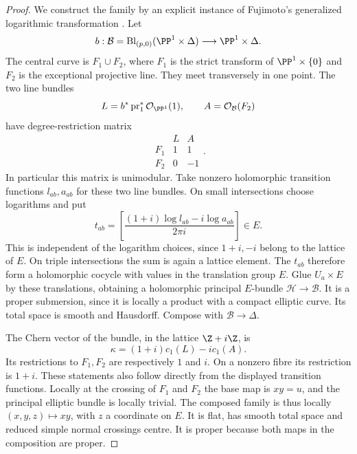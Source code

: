 \begin{proof}
We construct the family by an explicit instance of Fujimoto's
generalized logarithmic transformation
\citep[Definition 1.1, pp.~85--86]{Fujimoto1990AB}.
Let
\[
 b:\mathcal B=\operatorname{Bl}_{(p,0)}(\PP^1\times\Delta)
       \longrightarrow\PP^1\times\Delta.
\]
The central curve is $F_1\cup F_2$, where $F_1$ is the strict
transform of $\PP^1\times\{0\}$ and $F_2$ is the exceptional
projective line.  They meet transversely in one point.  The two
line bundles
\[
 L=b^*\operatorname{pr}_1^*\mathcal O_{\PP^1}(1),
 \qquad A=\mathcal O_{\mathcal B}(F_2)
\]
have degree-restriction matrix
\[
 \begin{array}{c|rr}
       &L&A\\\hline
 F_1&1&1\\
 F_2&0&-1
 \end{array}.
\]
In particular this matrix is unimodular.  Take nonzero holomorphic
transition functions $l_{ab},a_{ab}$ for these two line bundles.
On small intersections choose logarithms and put
\[
 t_{ab}=\left[
       \frac{(1+i)\log l_{ab}-i\log a_{ab}}{2\pi i}
                         \right]\in E.
\]
This is independent of the logarithm choices, since $1+i,-i$
belong to the lattice of $E$.  On triple intersections the sum
is again a lattice element.  The $t_{ab}$ therefore form a
holomorphic cocycle with values in the translation group $E$.
Glue $U_a\times E$ by these translations, obtaining a
holomorphic principal $E$-bundle $\mathcal H\to\mathcal B$.
It is a proper submersion, since it is locally a product with a
compact elliptic curve.  Its total space is smooth and Hausdorff.
Compose with $\mathcal B\to\Delta$.

The Chern vector of the bundle, in the lattice $\Z+i\Z$, is
\[
 \kappa=(1+i)c_1(L)-i c_1(A).
\]
Its restrictions to $F_1,F_2$ are respectively $1$ and $i$.
On a nonzero fibre its restriction is $1+i$.  These statements
also follow directly from the displayed transition functions.
Locally at the crossing of $F_1$ and $F_2$ the base map is
$xy=u$, and the principal elliptic bundle is locally trivial.
The composed family is thus locally $(x,y,z)\mapsto xy$,
with $z$ a coordinate on $E$.  It is flat, has smooth total
space and reduced simple normal crossings centre.  It is proper
because both maps in the composition are proper.


\end{proof}
